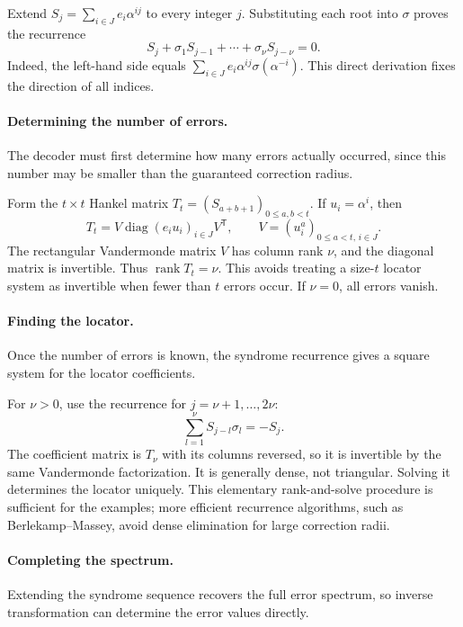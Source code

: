 Extend $S_j=\sum_{i\in J}e_i\alpha^{ij}$ to every integer $j$.
Substituting each root into $\sigma$ proves the recurrence
\[
 S_j+\sigma_1S_{j-1}+\cdots+\sigma_\nu S_{j-\nu}=0.
\]
Indeed, the left-hand side equals
$\sum_{i\in J}e_i\alpha^{ij}\sigma(\alpha^{-i})$.
This direct derivation fixes the direction of all indices.

\paragraph{Determining the number of errors.}

The decoder must first determine how many errors actually occurred, since
this number may be smaller than the guaranteed correction radius.

Form the $t\times t$ Hankel matrix
$T_t=(S_{a+b+1})_{0\leq a,b<t}$. If $u_i=\alpha^i$, then
\[
 T_t=V\operatorname{diag}(e_i u_i)_{i\in J}V^{\mathsf T},\qquad
 V=(u_i^a)_{0\leq a<t,\,i\in J}.
\]
The rectangular Vandermonde matrix $V$ has column rank $\nu$, and the
diagonal matrix is invertible. Thus $\operatorname{rank}T_t=\nu$.
This avoids treating a size-$t$ locator system as invertible when fewer
than $t$ errors occur. If $\nu=0$, all errors vanish.

\paragraph{Finding the locator.}

Once the number of errors is known, the syndrome recurrence gives a square
system for the locator coefficients.

For $\nu>0$, use the recurrence for $j=\nu+1,\ldots,2\nu$:
\[
 \sum_{l=1}^{\nu}S_{j-l}\sigma_l=-S_j.
\]
The coefficient matrix is $T_\nu$ with its columns reversed, so it is
invertible by the same Vandermonde factorization. It is generally dense,
not triangular. Solving it determines the locator uniquely.
This elementary rank-and-solve procedure is sufficient for the examples;
more efficient recurrence algorithms, such as Berlekamp--Massey, avoid
dense elimination for large correction radii.

\paragraph{Completing the spectrum.}

Extending the syndrome sequence recovers the full error spectrum, so inverse
transformation can determine the error values directly.


